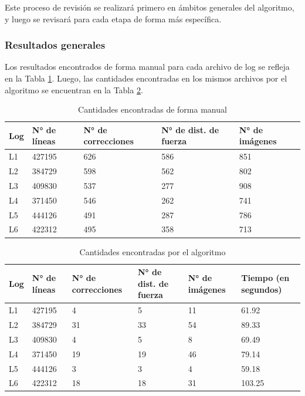 Este proceso de revisión se realizará primero en ámbitos generales del algoritmo, y luego se revisará para cada etapa de forma más específica.

\subsubsection{Resultados generales}

Los resultados encontrados de forma manual para cada archivo de log se refleja en la Tabla \ref{table:manual}. Luego, las cantidades encontradas en los mismos archivos por el algoritmo se encuentran en la Tabla \ref{table:auto}.


\begin{table}[h]
    \centering
    \caption{\label{table:manual} Cantidades encontradas de forma manual}
    \begin{tabular}{|p{2.8cm}|p{2.8cm}|p{2.8cm}|p{2.8cm}|p{2.8cm}|}
        \hline
        Log & N° de líneas & N° de correcciones & N° de dist. de fuerza & N° de imágenes \\
        \hline
        L1 & 427195 & 626 & 586 & 851 \\
        \hline
        L2 & 384729 & 598 & 562 & 802 \\
        \hline
        L3 & 409830 & 537 & 277 & 908 \\
        \hline
        L4 & 371450 & 546 & 262 & 741 \\
        \hline
        L5 & 444126 & 491 & 287 & 786 \\
        \hline
        L6 & 422312 & 495 & 358 & 713 \\
        \hline
    \end{tabular}
\end{table}


\begin{table}[h]
    \centering
    \caption{\label{table:auto} Cantidades encontradas por el algoritmo}
    \begin{tabular}{|p{2.3cm}|p{2.3cm}|p{2.3cm}|p{2.3cm}|p{2.3cm}|p{2.3cm}|}
        \hline
        Log & N° de líneas & N° de correcciones & N° de dist. de fuerza & N° de imágenes & Tiempo (en segundos) \\
        \hline
        L1 & 427195 & 4 & 5 & 11 & 61.92 \\
        \hline
        L2 & 384729 & 31 & 33 & 54 & 89.33 \\
        \hline
        L3 & 409830 & 4 & 5 & 8 & 69.49 \\
        \hline
        L4 & 371450 & 19 & 19 & 46 & 79.14 \\
        \hline
        L5 & 444126 & 3 & 3 & 4 & 59.18 \\
        \hline
        L6 & 422312 & 18 & 18 & 31 & 103.25 \\
        \hline
    \end{tabular}
\end{table}

